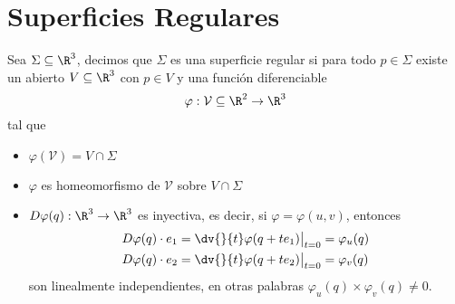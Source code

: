 \documentclass{article}
\begin{document}
\newpage
\section{Superficies Regulares}
\begin{dfn}
    Sea $\Sigma\subseteq\R^{3}$, decimos que $\Sigma$ es una superficie regular si para todo
    $p\in\Sigma$ existe un abierto $V\subseteq\R^{3}$ con $p\in V$ y una función diferenciable
    \begin{equation*}
        \varphi:\mathcal{V}\subseteq\R^{2}\to\R^{3}
    \end{equation*}
    tal que
    \begin{itemize}
        \item $\varphi(\mathcal{V})=V\cap\Sigma$
        \item $\varphi$ es homeomorfismo de $\mathcal{V}$ sobre $V\cap\Sigma$
        \item $D\varphi(q):\R^{3}\to\R^{3}$ es inyectiva, es decir, si $\varphi=\varphi(u,v)$, 
        entonces
        \begin{align*}
            & D\varphi(q)\cdot e_{1}=\dv{}{t}\varphi(q+te_{1})\big|_{t=0}=\varphi_{u}(q) \\
            & D\varphi(q)\cdot e_{2}=\dv{}{t}\varphi(q+te_{2})\big|_{t=0}=\varphi_{v}(q)
        \end{align*}
        son linealmente independientes, en otras palabras 
        $\varphi_{u}(q)\times\varphi_{v}(q)\neq0$.
    \end{itemize}
\end{dfn}

\end{document}

